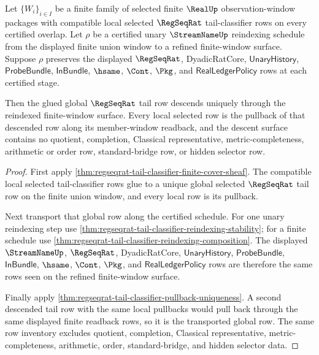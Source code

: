 \begin{theorem}
\label{thm:regseqrat-tail-classifier-descent-exactness}
Let $\{W_i\}_{i\in I}$ be a finite family of selected finite $\RealUp$
observation-window packages with compatible local selected $\RegSeqRat$
tail-classifier rows on every certified overlap. Let $\rho$ be a certified
unary $\StreamNameUp$ reindexing schedule from the displayed finite union
window to a refined finite-window surface. Suppose $\rho$ preserves the
displayed $\RegSeqRat$, DyadicRatCore, $\mathsf{UnaryHistory}$,
$\mathsf{ProbeBundle}$, $\mathsf{InBundle}$, $\hsame$, $\Cont$, $\Pkg$, and
$\mathsf{RealLedgerPolicy}$ rows at each certified stage.

Then the glued global $\RegSeqRat$ tail row descends uniquely through the
reindexed finite-window surface. Every local selected row is the pullback of
that descended row along its member-window readback, and the descent surface
contains no quotient, completion, Classical representative, metric-completeness,
arithmetic or order row, standard-bridge row, or hidden selector row.
\end{theorem}
\begin{proof}
First apply
\autoref{thm:regseqrat-tail-classifier-finite-cover-sheaf}. The compatible
local selected tail-classifier rows glue to a unique global selected
$\RegSeqRat$ tail row on the finite union window, and every local row is its
pullback.

Next transport that global row along the certified schedule. For one unary
reindexing step use
\autoref{thm:regseqrat-tail-classifier-reindexing-stability}; for a finite
schedule use
\autoref{thm:regseqrat-tail-classifier-reindexing-composition}. The displayed
$\StreamNameUp$, $\RegSeqRat$, DyadicRatCore, $\mathsf{UnaryHistory}$,
$\mathsf{ProbeBundle}$, $\mathsf{InBundle}$, $\hsame$, $\Cont$, $\Pkg$, and
$\mathsf{RealLedgerPolicy}$ rows are therefore the same rows seen on the
refined finite-window surface.

Finally apply
\autoref{thm:regseqrat-tail-classifier-pullback-uniqueness}. A second descended
tail row with the same local pullbacks would pull back through the same
displayed finite readback rows, so it is the transported global row. The same
row inventory excludes quotient, completion, Classical representative,
metric-completeness, arithmetic, order, standard-bridge, and hidden selector
data.
\end{proof}

